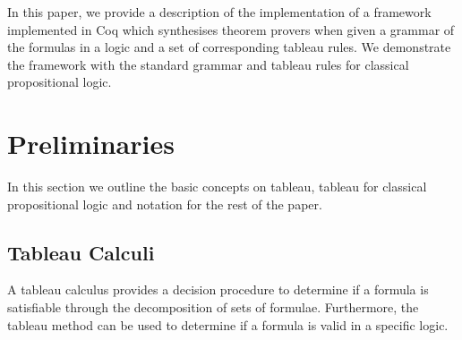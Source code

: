 \documentclass{llncs}
\begin{document}
In this paper, we provide a description of the implementation of a framework
implemented in Coq which synthesises theorem provers when given a grammar of
the formulas in a logic and a set of corresponding tableau rules. We
demonstrate the framework with the standard grammar and tableau rules for
classical propositional logic.
%
\section{Preliminaries}
%
In this section we outline the basic concepts on tableau, tableau for classical
propositional logic and notation for the rest of the paper.
%
\subsection{Tableau Calculi}
%
A tableau calculus provides a decision procedure to determine if a formula is
satisfiable through the decomposition of sets of formulae. Furthermore, the
tableau method can be used to determine if a formula is valid in a specific
logic.
\end{document}
